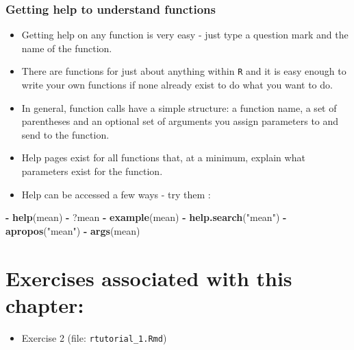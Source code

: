 \documentclass[]{book}
\newenvironment{Shaded}{\begin{snugshade}}{\end{snugshade}}
\newcommand{\KeywordTok}[1]{\textcolor[rgb]{0.13,0.29,0.53}{\textbf{#1}}}
\newcommand{\NormalTok}[1]{#1}
\newcommand{\OperatorTok}[1]{\textcolor[rgb]{0.81,0.36,0.00}{\textbf{#1}}}
\newcommand{\StringTok}[1]{\textcolor[rgb]{0.31,0.60,0.02}{#1}}
\providecommand{\tightlist}{%
  \setlength{\itemsep}{0pt}\setlength{\parskip}{0pt}}
\begin{document}
\hypertarget{getting-help-to-understand-functions}{%
\subsubsection{Getting help to understand functions}\label{getting-help-to-understand-functions}}

\begin{itemize}
\item
  Getting help on any function is very easy - just type a question mark and the name of the function.
\item
  There are functions for just about anything within \texttt{R} and it is easy enough to write your own functions if none already exist to do what you want to do.
\item
  In general, function calls have a simple structure: a function name, a set of parentheses and an optional set of arguments you assign parameters to and send to the function.
\item
  Help pages exist for all functions that, at a minimum, explain what parameters exist for the function.
\item
  Help can be accessed a few ways - try them :
\end{itemize}

\begin{Shaded}
\begin{Highlighting}[]
\OperatorTok{-}\StringTok{ }\KeywordTok{help}\NormalTok{(mean)}
\OperatorTok{-}\StringTok{ }\NormalTok{?mean}
\OperatorTok{-}\StringTok{ }\KeywordTok{example}\NormalTok{(mean)}
\OperatorTok{-}\StringTok{ }\KeywordTok{help.search}\NormalTok{(}\StringTok{"mean"}\NormalTok{)}
\OperatorTok{-}\StringTok{ }\KeywordTok{apropos}\NormalTok{(}\StringTok{"mean"}\NormalTok{)}
\OperatorTok{-}\StringTok{ }\KeywordTok{args}\NormalTok{(mean)}
\end{Highlighting}
\end{Shaded}

\hypertarget{exercises-associated-with-this-chapter-1}{%
\section{Exercises associated with this chapter:}\label{exercises-associated-with-this-chapter-1}}

\begin{itemize}
\tightlist
\item
  Exercise 2 (file: \texttt{rtutorial\_1.Rmd})
\end{itemize}
\end{document}

